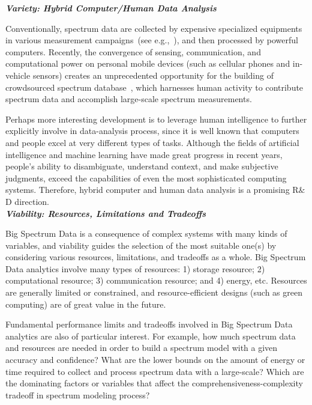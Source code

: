 \documentclass[12pt,draftcls,journal,letterpaper,oneside,onecolumn]{IEEEtran}
\begin{document}
\textbf{\emph{Variety: Hybrid Computer/Human Data Analysis}}

Conventionally, spectrum data are collected by expensive specialized equipments in various measurement campaigns~(see e.g.,~\cite{Spectrum_prediction,Spectrum_models}), and then processed by powerful computers. Recently, the convergence of sensing, communication, and computational power on personal mobile devices (such as cellular phones and in-vehicle sensors) creates an unprecedented opportunity for the building of crowdsourced spectrum database~\cite{JSAC-D2D}, which harnesses human activity to contribute spectrum data and accomplish large-scale spectrum measurements.

Perhaps more interesting development is to leverage human intelligence to further explicitly involve in data-analysis process, since it is well known that computers and people excel at very different types of tasks. Although the fields of artificial intelligence and machine learning have made great progress in recent years, people's ability to disambiguate, understand context, and make subjective judgments, exceed the capabilities of even the most sophisticated computing systems. Therefore, hybrid computer and human data analysis is a promising R$\&$D direction.
\\

\textbf{\emph{Viability: Resources, Limitations and Tradeoffs}}

Big Spectrum Data is a consequence of complex systems with many kinds of variables, and viability guides the selection of the most suitable one(s) by considering various resources, limitations, and tradeoffs as a whole. Big Spectrum Data analytics involve many types of resources: 1) storage resource; 2) computational resource; 3) communication resource; and 4) energy, etc. Resources are generally limited or constrained, and resource-efficient designs (such as green computing) are of great value in the future.

Fundamental performance limits and tradeoffs involved in Big Spectrum Data analytics are also of particular interest. For example, how much spectrum data and resources are needed in order to build a spectrum model with a given accuracy and confidence? What are the lower bounds on the amount of energy or time required to collect and process spectrum data with a large-scale? Which are the dominating factors or variables that affect the comprehensiveness-complexity tradeoff in spectrum modeling process?
\\
\end{document}
